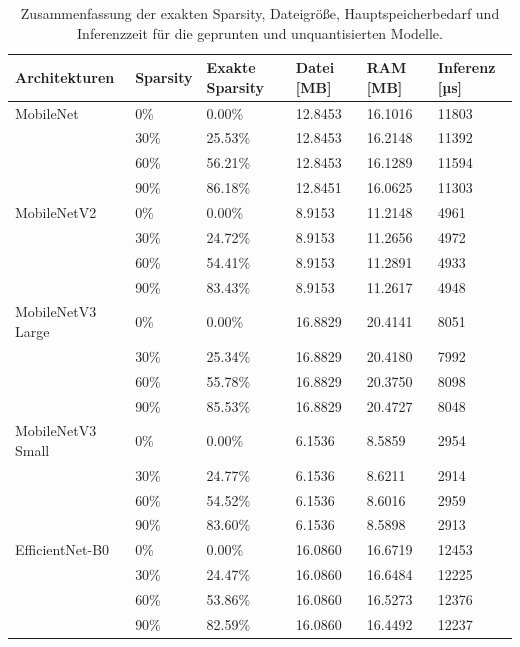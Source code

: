 \begin{table}[ht]
\centering
\begin{tabular}{llp{1.5cm}lll}
\toprule
Architekturen & Sparsity & Exakte Sparsity & Datei [MB] &  RAM [MB]  & Inferenz [µs]   \\
\midrule
MobileNet & 0\% &           0.00\% &     12.8453 &   16.1016 &          11803 \\
                & 30\% &          25.53\% &     12.8453 &   16.2148 &          11392 \\
                & 60\% &          56.21\% &     12.8453 &   16.1289 &          11594 \\
                & 90\% &          86.18\% &     12.8451 &   16.0625 &          11303 \\
\midrule
MobileNetV2 & 0\% &           0.00\% &      8.9153 &   11.2148 &           4961 \\
                & 30\% &          24.72\% &      8.9153 &   11.2656 &           4972 \\
                & 60\% &          54.41\% &      8.9153 &   11.2891 &           4933 \\
                & 90\% &          83.43\% &      8.9153 &   11.2617 &           4948 \\
\midrule
MobileNetV3 Large & 0\% &           0.00\% &     16.8829 &   20.4141 &           8051 \\
                & 30\% &          25.34\% &     16.8829 &   20.4180 &           7992 \\
                & 60\% &          55.78\% &     16.8829 &   20.3750 &           8098 \\
                & 90\% &          85.53\% &     16.8829 &   20.4727 &           8048 \\
\midrule
MobileNetV3 Small & 0\% &           0.00\% &      6.1536 &    8.5859 &           2954 \\
                & 30\% &          24.77\% &      6.1536 &    8.6211 &           2914 \\
                & 60\% &          54.52\% &      6.1536 &    8.6016 &           2959 \\
                & 90\% &          83.60\% &      6.1536 &    8.5898 &           2913 \\
\midrule
EfficientNet-B0 & 0\% &           0.00\% &     16.0860 &   16.6719 &          12453 \\
                & 30\% &          24.47\% &     16.0860 &   16.6484 &          12225 \\
                & 60\% &          53.86\% &     16.0860 &   16.5273 &          12376 \\
                & 90\% &          82.59\% &     16.0860 &   16.4492 &          12237 \\
\bottomrule
\end{tabular}
\caption{Zusammenfassung der exakten Sparsity, Dateigröße, Hauptspeicherbedarf und Inferenzzeit für die geprunten und unquantisierten Modelle.}
\label{t4.5}
\end{table}

